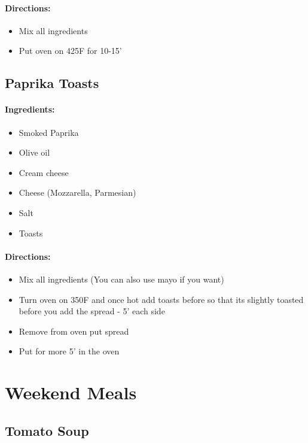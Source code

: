 \documentclass{article}
\begin{document}
\paragraph{Directions:}
\begin{itemize}
	\item Mix all ingredients
	\item Put oven on 425F for 10-15'
\end{itemize}

\subsection{Paprika Toasts}

\paragraph{Ingredients:}

\begin{itemize}
	\item Smoked Paprika
	\item Olive oil
	\item Cream cheese
	\item Cheese (Mozzarella, Parmesian)
	\item Salt
	\item Toasts
\end{itemize}

\paragraph{Directions:}
\begin{itemize}
	\item Mix all ingredients (You can also use mayo if you want)
	\item Turn oven on 350F and once hot add toasts before so that its slightly toasted before you add the spread - 5' each side
	\item Remove from oven put spread
	\item Put for more 5' in the oven
\end{itemize}

\section{Weekend Meals}

\subsection{Tomato Soup}
\end{document}
